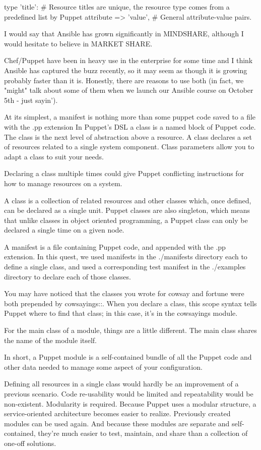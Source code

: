 type {'title': # Resource titles are unique, the resource type comes from a predefined list by Puppet
    attribute => 'value', # General attribute-value pairs. 
}

I would say that Ansible has grown significantly in MINDSHARE, although I would hesitate to believe in MARKET SHARE.

Chef/Puppet have been in heavy use in the enterprise for some time and I think Ansible has captured the buzz recently, so it may seem as though it is growing probably faster than it is. Honestly, there are reasons to use both (in fact, we "might" talk about some of them when we launch our Ansible course on October 5th - just sayin'). 

At its simplest, a manifest is nothing more than some puppet code saved to a file with the .pp extension
In Puppet's DSL a class is a named block of Puppet code. The class is the next level of abstraction above a resource. A class declares a set of resources related to a single system component. Class parameters allow you to adapt a class to suit your needs. 

Declaring a class multiple times could give Puppet conflicting instructions for how to manage resources on a system.

A class is a collection of related resources and other classes which, once defined, can be declared as a single unit. Puppet classes are also singleton, which means that unlike classes in object oriented programming, a Puppet class can only be declared a single time on a given node.

A manifest is a file containing Puppet code, and appended with the .pp extension. In this quest, we used manifests in the ./manifests directory each to define a single class, and used a corresponding test manifest in the ./examples directory to declare each of those classes.

You may have noticed that the classes you wrote for cowsay and fortune were both prepended by cowsayings::. When you declare a class, this scope syntax tells Puppet where to find that class; in this case, it's in the cowsayings module.

For the main class of a module, things are a little different. The main class shares the name of the module itself.

In short, a Puppet module is a self-contained bundle of all the Puppet code and other data needed to manage some aspect of your configuration.

Defining all resources in a single class would hardly be an improvement of a previous scenario. Code re-usability would be limited and repeatability would be non-existent. Modularity is required. Because Puppet uses a modular structure, a service-oriented architecture becomes easier to realize. Previously created modules can be used again. And because these modules are separate and self-contained, they're much easier to test, maintain, and share than a collection of one-off solutions.

